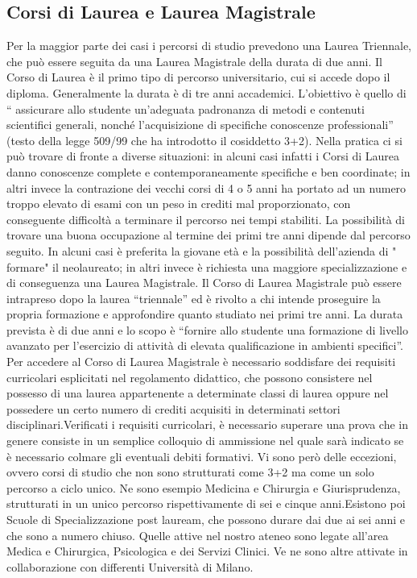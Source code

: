 \subsection{Corsi di Laurea e Laurea Magistrale}
Per la maggior parte dei casi i percorsi di studio prevedono una Laurea Triennale, che può essere seguita da una Laurea Magistrale della durata di due anni. Il Corso di Laurea è il primo tipo di percorso universitario, cui si accede dopo il diploma. Generalmente la durata è di tre anni accademici.
L’obiettivo è quello di “ assicurare allo studente un’adeguata padronanza di metodi e contenuti scientifici generali, nonché l’acquisizione di specifiche conoscenze professionali” (testo della legge 509/99 che ha introdotto il cosiddetto 3+2).
Nella pratica ci si può trovare di fronte a diverse situazioni: in alcuni casi infatti i Corsi di Laurea danno conoscenze complete e contemporaneamente specifiche e ben coordinate; in altri invece la contrazione dei vecchi corsi di 4 o 5 anni ha portato ad un numero troppo elevato di esami con un peso in crediti mal proporzionato, con  conseguente difficoltà a terminare il percorso nei tempi stabiliti. 
La possibilità di trovare una buona occupazione al termine dei primi tre anni dipende dal percorso seguito. In alcuni casi è preferita la giovane età e la possibilità dell'azienda di " formare" il neolaureato; in altri invece è richiesta una maggiore specializzazione e di conseguenza una Laurea Magistrale.
Il Corso di Laurea Magistrale può essere intrapreso dopo la laurea “triennale” ed è rivolto a chi intende proseguire la propria formazione e approfondire quanto studiato nei primi tre anni. La durata prevista è di due anni e lo scopo è “fornire allo studente una formazione di livello avanzato per l’esercizio di attività di elevata qualificazione in ambienti specifici”.
Per accedere al Corso di Laurea Magistrale è necessario soddisfare dei requisiti curricolari esplicitati nel regolamento didattico, che possono consistere nel possesso di una laurea appartenente a determinate classi di laurea oppure nel possedere un certo numero di crediti acquisiti in determinati settori disciplinari.Verificati i requisiti curricolari, è necessario superare una prova  che in genere consiste in un semplice colloquio di ammissione nel quale sarà indicato se è necessario colmare gli eventuali debiti formativi.
Vi sono però delle eccezioni, ovvero corsi di studio che non sono strutturati come 3+2 ma come un solo percorso a ciclo unico. Ne sono esempio Medicina e Chirurgia e Giurisprudenza, strutturati in un unico percorso rispettivamente di sei e cinque anni.Esistono poi Scuole di Specializzazione post lauream, che possono durare dai due ai sei anni e che sono a numero chiuso. Quelle attive nel nostro ateneo sono legate all’area Medica e Chirurgica, Psicologica e dei Servizi Clinici. Ve ne sono altre attivate in collaborazione con differenti Università di Milano.
